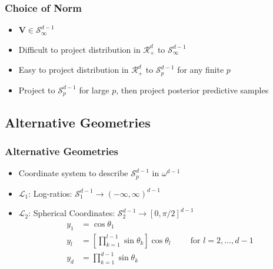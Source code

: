 \documentclass[aspectratio=169]{beamer}
\begin{document}
\begin{frame}
  \frametitle{Choice of Norm}
  \begin{itemize}
    \item $\bm{V} \in \mathcal{S}_{\infty}^{d-1}$
    \pause
    \item Difficult to project distribution in $\mathcal{R}_+^{d}$ to $\mathcal{S}_{\infty}^{d-1}$
    \pause
    \item Easy to project distribution in $\mathcal{R}_+^{d}$ to $\mathcal{S}_{p}^{d-1}$ for any finite $p$
    \pause
    \item Project to $\mathcal{S}_{p}^{d-1}$ for large $p$, then project posterior predictive samples
  \end{itemize}
\end{frame}

\subsection{Alternative Geometries}

\begin{frame}
  \frametitle{Alternative Geometries}
  \begin{itemize}
    \item Coordinate system to describe $\mathcal{S}_p^{d-1}$ in $\omega^{d-1}$
    \item $\mathcal{L}_1$: Log-ratios:  $\mathcal{S}_1^{d-1} \rightarrow (-\infty,\infty)^{d-1}$
    \item $\mathcal{L}_2$: Spherical Coordinates: $\mathcal{S}_2^{d-1} \rightarrow [0,\pi/2]^{d-1}$
      \begin{equation*}
        \label{eqn:spherical}
        \begin{aligned}
          y_1 &= \cos\theta_1\\
          y_l &= \left[{\textstyle\prod}_{k = 1}^{l-1}\sin\theta_k\right]\cos\theta_l
                                    \hspace{1cm}\text{for } l = 2,\ldots,d-1\\
          y_d &= {\textstyle\prod}_{k = 1}^{d-1}\sin\theta_k
        \end{aligned}
      \end{equation*}
  \end{itemize}
\end{frame}
\end{document}

